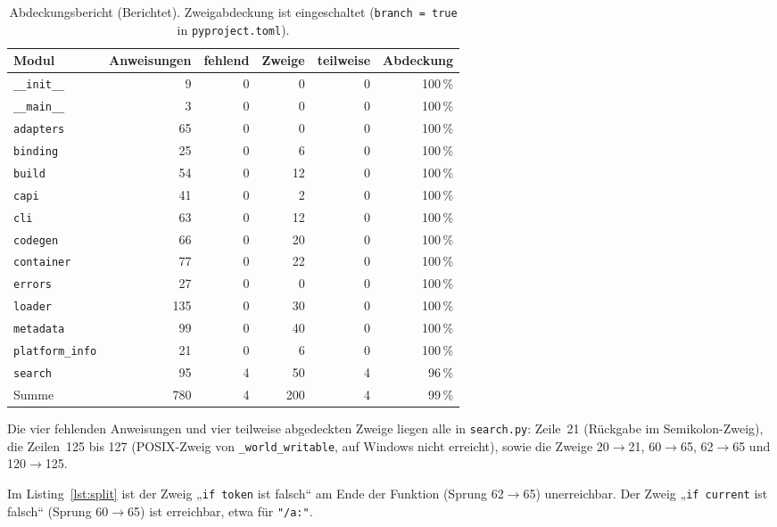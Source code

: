 \begin{table}[!ht]
	\centering
	\small
	\begin{tabular}{@{}lrrrrr@{}}
		\toprule
		Modul & Anweisungen & fehlend & Zweige & teilweise & Abdeckung \\
		\midrule
		\texttt{\_\_init\_\_} & 9 & 0 & 0 & 0 & 100\,\% \\
		\texttt{\_\_main\_\_} & 3 & 0 & 0 & 0 & 100\,\% \\
		\texttt{adapters} & 65 & 0 & 0 & 0 & 100\,\% \\
		\texttt{binding} & 25 & 0 & 6 & 0 & 100\,\% \\
		\texttt{build} & 54 & 0 & 12 & 0 & 100\,\% \\
		\texttt{capi} & 41 & 0 & 2 & 0 & 100\,\% \\
		\texttt{cli} & 63 & 0 & 12 & 0 & 100\,\% \\
		\texttt{codegen} & 66 & 0 & 20 & 0 & 100\,\% \\
		\texttt{container} & 77 & 0 & 22 & 0 & 100\,\% \\
		\texttt{errors} & 27 & 0 & 0 & 0 & 100\,\% \\
		\texttt{loader} & 135 & 0 & 30 & 0 & 100\,\% \\
		\texttt{metadata} & 99 & 0 & 40 & 0 & 100\,\% \\
		\texttt{platform\_info} & 21 & 0 & 6 & 0 & 100\,\% \\
		\texttt{search} & 95 & 4 & 50 & 4 & 96\,\% \\
		\midrule
		Summe & 780 & 4 & 200 & 4 & 99\,\% \\
		\bottomrule
	\end{tabular}
	\caption{Abdeckungsbericht (Berichtet). Zweigabdeckung ist eingeschaltet (\texttt{branch = true} in \texttt{pyproject.toml}).}
	\label{tab:abdeckung}
\end{table}

Die vier fehlenden Anweisungen und vier teilweise abgedeckten Zweige liegen alle in \texttt{search.py}: Zeile~21 (Rückgabe im Semikolon-Zweig), die Zeilen~125 bis 127 (POSIX-Zweig von \texttt{\_world\_writable}, auf Windows nicht erreicht), sowie die Zweige 20$\to$21, 60$\to$65, 62$\to$65 und 120$\to$125.

\begin{lemma}
	\label{lem:tot}
	Im Listing~\ref{lst:split} ist der Zweig „\texttt{if token} ist falsch“ am Ende der Funktion (Sprung 62$\to$65) unerreichbar. Der Zweig „\texttt{if current} ist falsch“ (Sprung 60$\to$65) ist erreichbar, etwa für \texttt{"/a:"}.
\end{lemma}

